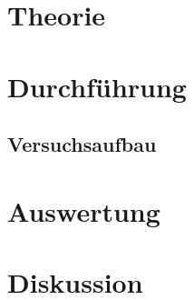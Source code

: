 \maketitle
\setcounter{page}{1}
\tableofcontents
\newpage
{}
\section{Theorie}
\section{Durchführung}
\subsection{Versuchsaufbau}
\section{Auswertung}
\section{Diskussion}
\newpage
\nocite{*}
\printbibliography
